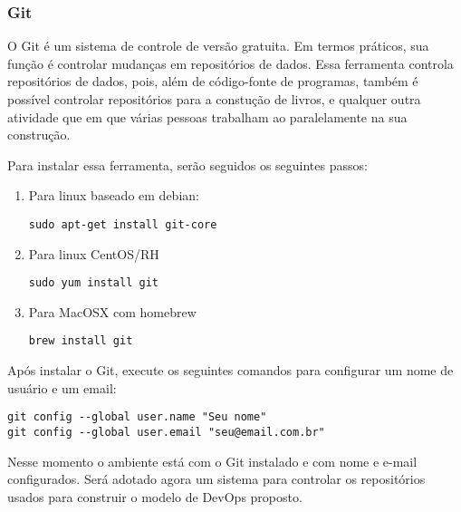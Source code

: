 \subsubsection{Git}

O Git é um sistema de controle de versão gratuita. 
Em termos práticos, sua função é controlar mudanças 
em repositórios de dados. Essa ferramenta controla 
repositórios de dados, pois, além de código-fonte de 
programas, também é possível controlar repositórios 
para a constução de livros, e qualquer outra 
atividade que em que várias pessoas trabalham ao 
paralelamente na sua construção.

Para instalar essa ferramenta, serão seguidos os 
seguintes passos:
  \begin{enumerate}
   \item Para linux baseado em debian:
      \begin{lstlisting}
sudo apt-get install git-core
      \end{lstlisting}
      
   \item Para linux CentOS/RH
      \begin{lstlisting}
sudo yum install git
      \end{lstlisting}
   
   \item Para MacOSX com homebrew
      \begin{lstlisting}
brew install git
      \end{lstlisting}
 \end{enumerate}
Após instalar o Git, execute os seguintes comandos 
para configurar um nome de usuário e um email: 
      \begin{lstlisting}
git config --global user.name "Seu nome"
git config --global user.email "seu@email.com.br"
      \end{lstlisting}
Nesse momento o ambiente está com o Git instalado 
e com nome e e-mail configurados. Será adotado 
agora um sistema para controlar os repositórios 
usados para construir o modelo de DevOps proposto.

